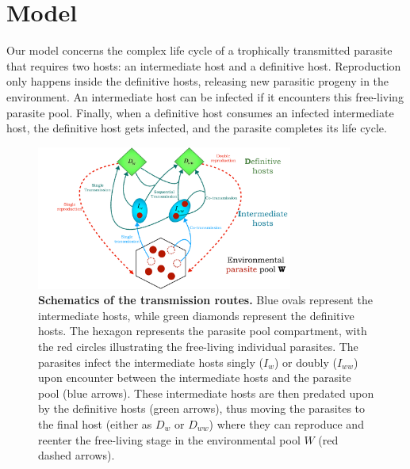 \documentclass[a4paper]{scrartcl}
\begin{document}
\section*{Model}

Our model concerns the complex life cycle of a trophically transmitted parasite that requires two hosts: an intermediate host and a definitive host. 
Reproduction only happens inside the definitive hosts, releasing new parasitic progeny in the environment. 
An intermediate host can be infected if it encounters this free-living parasite pool. 
Finally, when a definitive host consumes an infected intermediate host, the definitive host gets infected, and the parasite completes its life cycle.

\begin{figure}[ht!]
\captionsetup{format=plain}
\centering
\includegraphics[width=0.75\textwidth]{Figures/schematics.pdf}
\caption{\textbf{Schematics of the transmission routes.} 
Blue ovals represent the intermediate hosts, while green diamonds represent the definitive hosts.
The hexagon represents the parasite pool compartment, with the red circles illustrating the free-living individual parasites.
The parasites infect the intermediate hosts singly ($I_w$) or doubly ($I_{ww}$) upon encounter between the intermediate hosts and the parasite pool (blue arrows).
These intermediate hosts are then predated upon by the definitive hosts (green arrows), thus moving the parasites to the final host (either as $D_w$ or $D_{ww}$) where they can reproduce and reenter the free-living stage in the environmental pool $W$ (red dashed arrows).
}
\label{fig:schematic}
\end{figure}
\end{document}

